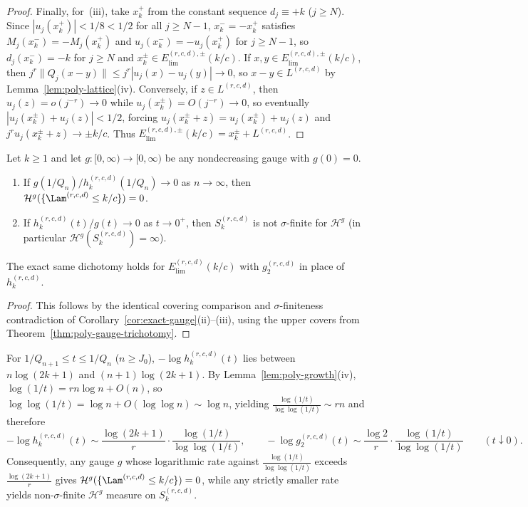 \begin{proof}
Finally, for~(iii), take $x_k^+$ from the constant sequence $d_j\equiv+k$ ($j\ge N$).
Since $|u_j(x_k^+)|<1/8<1/2$ for all $j\ge N-1$, $x_k^-=-x_k^+$ satisfies
$M_j(x_k^-)=-M_j(x_k^+)$ and $u_j(x_k^-)=-u_j(x_k^+)$ for $j\ge N-1$, so
$d_j(x_k^-)=-k$ for $j\ge N$ and $x_k^\pm\in E_{\mathrm{lim}}^{(r,c,d),\pm}(k/c)$.
If $x,y\in E_{\mathrm{lim}}^{(r,c,d),\pm}(k/c)$, then
$j^r\|Q_j(x-y)\|\le j^r|u_j(x)-u_j(y)|\to0$, so $x-y\in L^{(r,c,d)}$ by
Lemma~\ref{lem:poly-lattice}(iv). Conversely, if $z\in L^{(r,c,d)}$, then
$u_j(z)=o(j^{-r})\to0$ while $u_j(x_k^\pm)=O(j^{-r})\to0$, so eventually
$|u_j(x_k^\pm)+u_j(z)|<1/2$, forcing $u_j(x_k^\pm+z)=u_j(x_k^\pm)+u_j(z)$ and
$j^ru_j(x_k^\pm+z)\to\pm k/c$. Thus $E_{\mathrm{lim}}^{(r,c,d),\pm}(k/c)=x_k^\pm+L^{(r,c,d)}$.
\end{proof}

\begin{corollary}\label{cor:poly-exact-gauge}
Let $k\ge1$ and let $g:[0,\infty)\to[0,\infty)$ be any nondecreasing gauge with $g(0)=0$.
\begin{enumerate}[label=(\roman*),leftmargin=2em]
\item If $g(1/Q_n)/h_k^{(r,c,d)}(1/Q_n)\to0$ as $n\to\infty$, then
$\mathcal H^g(\{\Lam^{(r,c,d)}\le k/c\})=0$.
\item If $h_k^{(r,c,d)}(t)/g(t)\to0$ as $t\to0^+$, then $S_k^{(r,c,d)}$ is not
$\sigma$-finite for $\mathcal H^g$ (in particular $\mathcal H^g(S_k^{(r,c,d)})=\infty$).
\end{enumerate}
The exact same dichotomy holds for $E_{\mathrm{lim}}^{(r,c,d)}(k/c)$ with
$g_2^{(r,c,d)}$ in place of $h_k^{(r,c,d)}$.
\end{corollary}

\begin{proof}
This follows by the identical covering comparison and $\sigma$-finiteness
contradiction of Corollary~\ref{cor:exact-gauge}(ii)--(iii), using the upper
covers from Theorem~\ref{thm:poly-gauge-trichotomy}.
\end{proof}

\begin{remark}\label{rem:poly-gauge-scale}
For $1/Q_{n+1}\le t\le 1/Q_n$ ($n\ge J_0$), $-\log h_k^{(r,c,d)}(t)$ lies between
$n\log(2k+1)$ and $(n+1)\log(2k+1)$. By Lemma~\ref{lem:poly-growth}(iv),
$\log(1/t)=rn\log n+O(n)$, so $\log\log(1/t)=\log n+O(\log\log n)\sim\log n$,
yielding $\frac{\log(1/t)}{\log\log(1/t)}\sim rn$ and therefore
\[
-\log h_k^{(r,c,d)}(t)\sim\frac{\log(2k+1)}{r}\cdot\frac{\log(1/t)}{\log\log(1/t)},\qquad
-\log g_2^{(r,c,d)}(t)\sim\frac{\log2}{r}\cdot\frac{\log(1/t)}{\log\log(1/t)}
\qquad(t\downarrow0).
\]
Consequently, any gauge $g$ whose logarithmic rate against
$\frac{\log(1/t)}{\log\log(1/t)}$ exceeds $\frac{\log(2k+1)}{r}$ gives
$\mathcal H^g(\{\Lam^{(r,c,d)}\le k/c\})=0$, while any strictly smaller rate
yields non-$\sigma$-finite $\mathcal H^g$ measure on $S_k^{(r,c,d)}$.
\end{remark}

